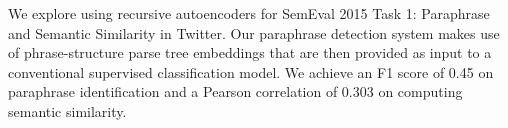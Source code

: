 We explore using recursive autoencoders for SemEval 2015 Task 1: Paraphrase and Semantic Similarity in Twitter. Our paraphrase detection system makes use of phrase-structure parse tree embeddings that are then provided as input to a conventional supervised classification model. We achieve an F1 score of 0.45 on paraphrase identification and a Pearson correlation of 0.303 on computing semantic similarity.
